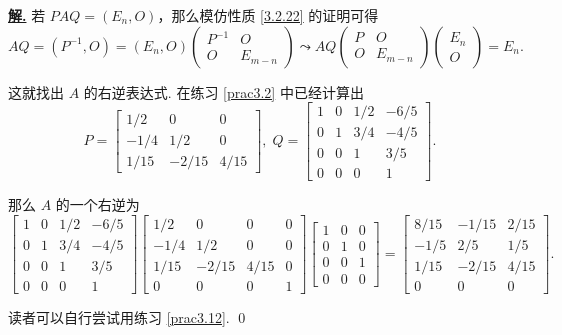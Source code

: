 \documentclass[10pt,openany]{article}
\theoremstyle{thmstyle} %
\theoremstyle{defstyle} %
\theoremstyle{prostyle} %
\theoremstyle{exastyle}
\theoremstyle{remstyle}
\newenvironment{solution}{\par\underline{\textbf{解.}} \;\fangsong}{\qed\par}
\begin{document}
\begin{solution}
	若 \( PAQ=(E_n,O) \)，那么模仿性质 \ref{3.2.22} 的证明可得
	\[ AQ=(P^{-1},O)=(E_n,O)\begin{pmatrix}
		P^{-1} & O \\
		O & E_{m-n}
	\end{pmatrix} \leadsto AQ\begin{pmatrix}
	P & O \\
	O & E_{m-n}
	\end{pmatrix}\begin{pmatrix}
	E_n  \\
	O 
	\end{pmatrix}=E_n. \]
	
	这就找出 \( A \) 的右逆表达式. 在练习 \ref{prac3.2} 中已经计算出
	\[ P=\begin{bmatrix}
		1/2 & 0 & 0 \\
		-1/4 & 1/2 & 0 \\
		1/15 & -2/15 & 4/15
	\end{bmatrix}, \; Q=\begin{bmatrix}
	1 & 0 & 1/2 & -6/5 \\
	0 & 1 & 3/4 & -4/5 \\
	0 & 0 & 1 & 3/5 \\
	0 & 0 & 0 & 1
	\end{bmatrix}. \]
	
	
	那么 \( A \) 的一个右逆为
	\[ \begin{bmatrix}
		1 & 0 & 1/2 & -6/5 \\
		0 & 1 & 3/4 & -4/5 \\
		0 & 0 & 1 & 3/5 \\
		0 & 0 & 0 & 1
	\end{bmatrix}\begin{bmatrix}
	1/2 & 0 & 0 & 0 \\
	-1/4 & 1/2 & 0 & 0 \\
	1/15 & -2/15 & 4/15 & 0 \\
	0 & 0 & 0 & 1
	\end{bmatrix}\begin{bmatrix}
	1 & 0 & 0 \\
	0 & 1 & 0 \\
    0 & 0 & 1 \\
	0 & 0 & 0
	\end{bmatrix}=\begin{bmatrix}
	8/15 & -1/15 & 2/15 \\
	-1/5 &  2/5  & 1/5 \\
	1/15 & -2/15 & 4/15 \\
	0    &  0    & 0
	\end{bmatrix}. \]
	
	读者可以自行尝试用练习 \ref{prac3.12}.
\end{solution}
\end{document}
